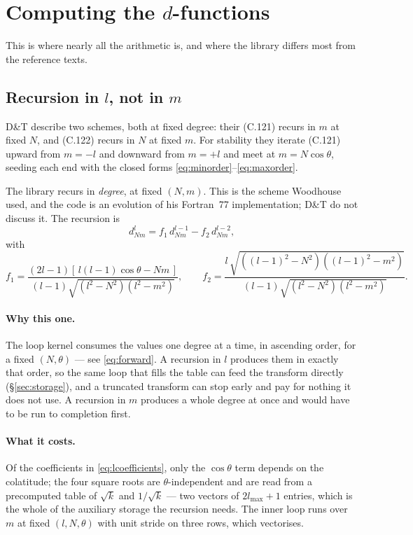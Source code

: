 \documentclass[11pt,a4paper]{article}
\begin{document}
\section{Computing the \texorpdfstring{$d$}{d}-functions}
\label{sec:recursion}

This is where nearly all the arithmetic is, and where the library differs
most from the reference texts.

\subsection{Recursion in \texorpdfstring{$l$}{l}, not in \texorpdfstring{$m$}{m}}

D\&T describe two schemes, both at fixed degree: their (C.121) recurs in
$m$ at fixed $N$, and (C.122) recurs in $N$ at fixed $m$.  For stability
they iterate (C.121) upward from $m=-l$ and downward from $m=+l$ and meet
at $m = N\cos\theta$, seeding each end with the closed forms
\eqref{eq:minorder}--\eqref{eq:maxorder}.

The library recurs in \emph{degree}, at fixed $(N,m)$.  This is the scheme
Woodhouse used, and the code is an evolution of his Fortran~77
implementation; D\&T do not discuss it.  The recursion is
\begin{equation}
  d^{l}_{Nm} = f_1\, d^{l-1}_{Nm} - f_2\, d^{l-2}_{Nm},
  \label{eq:lrecursion}
\end{equation}
with
\begin{equation}
  f_1 = \frac{(2l-1)\left[\,l(l-1)\cos\theta - Nm\,\right]}
             {(l-1)\sqrt{(l^2-N^2)(l^2-m^2)}},
  \qquad
  f_2 = \frac{l\,\sqrt{\left((l-1)^2-N^2\right)\left((l-1)^2-m^2\right)}}
             {(l-1)\sqrt{(l^2-N^2)(l^2-m^2)}} .
  \label{eq:lcoefficients}
\end{equation}

\paragraph{Why this one.}  The loop kernel consumes the values one degree
at a time, in ascending order, for a fixed $(N,\theta)$ --- see
\eqref{eq:forward}.  A recursion in $l$ produces them in exactly that
order, so the same loop that fills the table can feed the transform
directly (\S\ref{sec:storage}), and a truncated transform can stop early
and pay for nothing it does not use.  A recursion in $m$ produces a whole
degree at once and would have to be run to completion first.

\paragraph{What it costs.}  Of the coefficients in
\eqref{eq:lcoefficients}, only the $\cos\theta$ term depends on the
colatitude; the four square roots are $\theta$-independent and are read
from a precomputed table of $\sqrt{k}$ and $1/\sqrt{k}$ --- two vectors of
$2l_{\max}+1$ entries, which is the whole of the auxiliary storage the
recursion needs.  The inner loop runs over $m$ at fixed $(l,N,\theta)$
with unit stride on three rows, which vectorises.
\end{document}
